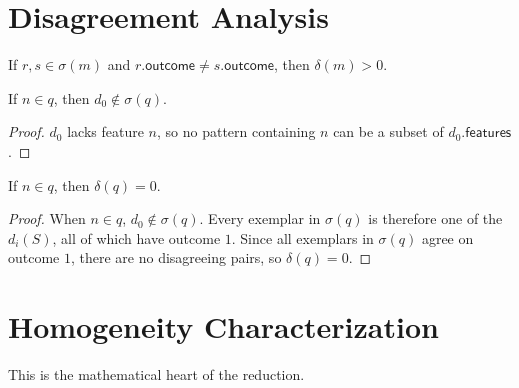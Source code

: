 \section{Disagreement Analysis}

\begin{lemma}
  \label{lem:delta-pos}
  \leanok
  If $r, s \in \sigma(m)$ and $r.\mathsf{outcome} \neq s.\mathsf{outcome}$,
  then $\delta(m) > 0$.
\end{lemma}

\begin{lemma}
  \label{lem:d0-not-in-sigma-fresh}
  \leanok
  If $n \in q$, then $d_0 \notin \sigma(q)$.

  \begin{proof}
    $d_0$ lacks feature $n$, so no pattern containing $n$ can be a subset of
    $d_0.\mathsf{features}$.
  \end{proof}
\end{lemma}

\begin{lemma}
  \label{lem:delta-zero-fresh}
  \leanok
  If $n \in q$, then $\delta(q) = 0$.

  \begin{proof}
    When $n \in q$, $d_0 \notin \sigma(q)$.  Every exemplar in $\sigma(q)$ is
    therefore one of the $d_i(S)$, all of which have outcome $1$.  Since all
    exemplars in $\sigma(q)$ agree on outcome $1$, there are no disagreeing
    pairs, so $\delta(q) = 0$.
  \end{proof}
\end{lemma}

\section{Homogeneity Characterization}

This is the mathematical heart of the reduction.


